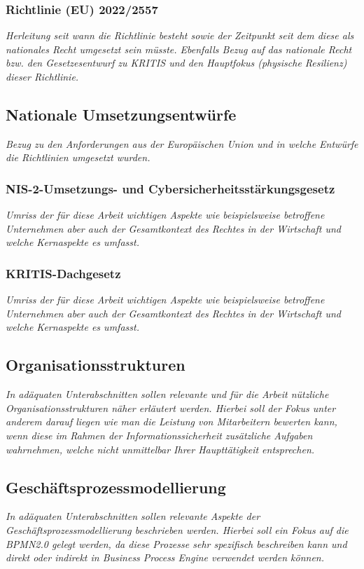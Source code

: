 \documentclass[11pt,a4paper]{article}   %
\begin{document}
            \subsubsection{Richtlinie (EU) 2022/2557}
            \emph{Herleitung seit wann die Richtlinie besteht sowie der Zeitpunkt seit dem diese als nationales Recht umgesetzt sein müsste. Ebenfalls Bezug auf das nationale Recht bzw. den Gesetzesentwurf zu KRITIS und den Hauptfokus (physische Resilienz) dieser Richtlinie.}            
        \subsection{Nationale Umsetzungsentwürfe}
            \emph{Bezug zu den Anforderungen aus der Europäischen Union und in welche Entwürfe die Richtlinien umgesetzt wurden.}
            \subsubsection{NIS-2-Umsetzungs- und Cybersicherheitsstärkungsgesetz}
                \emph{Umriss der für diese Arbeit wichtigen Aspekte wie beispielsweise betroffene Unternehmen aber auch der Gesamtkontext des Rechtes in der Wirtschaft und welche Kernaspekte es umfasst.}
            \subsubsection{KRITIS-Dachgesetz}
            \emph{Umriss der für diese Arbeit wichtigen Aspekte wie beispielsweise betroffene Unternehmen aber auch der Gesamtkontext des Rechtes in der Wirtschaft und welche Kernaspekte es umfasst.}
        \subsection{Organisationsstrukturen}
            \emph{In adäquaten Unterabschnitten sollen relevante und für die Arbeit nützliche Organisationsstrukturen näher erläutert werden. Hierbei soll der Fokus unter anderem darauf liegen wie man die Leistung von Mitarbeitern bewerten kann, wenn diese im Rahmen der Informationssicherheit zusätzliche Aufgaben wahrnehmen, welche nicht unmittelbar Ihrer Haupttätigkeit entsprechen.}
        \subsection{Geschäftsprozessmodellierung}
            \emph{In adäquaten Unterabschnitten sollen relevante Aspekte der Geschäftsprozessmodellierung beschrieben werden. Hierbei soll ein Fokus auf die BPMN2.0 gelegt werden, da diese Prozesse sehr spezifisch beschreiben kann und direkt oder indirekt in Business Process Engine verwendet werden können.}
\end{document}
